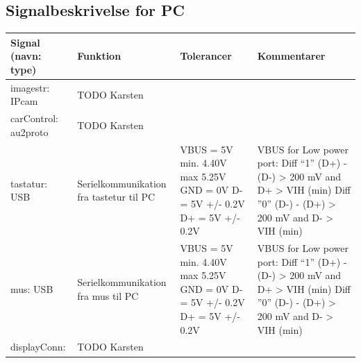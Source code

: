 \subsection{Signalbeskrivelse for PC}

\begin{table}[h]
	\centering
	\begin{tabularx}{\textwidth}{|l|X|X|X|} \hline
	\textbf{Signal (navn: type)} & \textbf{Funktion} & \textbf{Tolerancer} & \textbf{Kommentarer} \\ \hline
imagestr: IPcam
	& TODO Karsten %
	& 
 	& 
	\\ \hline
	
carControl: au2proto
	& TODO Karsten %
	& 
	& 
	\\ \hline
	
tastatur: USB
	& Serielkommunikation fra tastetur til PC 
	& VBUS = 5V min. 4.40V max 5.25V \newline
		GND = 0V \newline
		D- = 5V +/- 0.2V \newline
		D+ = 5V +/- 0.2V
	
	& VBUS for Low power port: \newline
		Diff  “1” \newline
		(D+) - (D-) > 200 mV \newline
		and D+ > VIH (min) \newline
		Diff ”0” \newline
		(D-) - (D+) > 200 mV \newline
		and D- > VIH (min)
	\\ \hline	
	
mus: USB
	& Serielkommunikation fra mus til PC 
	& VBUS = 5V min. 4.40V max 5.25V \newline
		GND = 0V \newline
		D- = 5V +/- 0.2V \newline
		D+ = 5V +/- 0.2V

	& VBUS for Low power port: \newline
		Diff  “1” \newline
		(D+) - (D-) > 200 mV \newline
		and D+ > VIH (min) \newline
		Diff ”0” \newline
		(D-) - (D+) > 200 mV \newline
		and D- > VIH (min)
\\ \hline
	
displayConn:
	&   TODO Karsten %
	&  
	&  
	\\ \hline
	

\end{tabularx}
\end{table}
